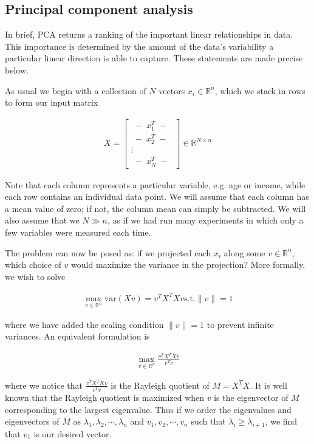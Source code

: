 \subsection{Principal component analysis \label{sec:pca}}

In brief, PCA returns a ranking of the important linear relationships
in data. This importance is determined by the amount of the data's
variability a particular linear direction is able to capture. These
statements are made precise below.

As usual we begin with a collection of $N$ vectors $x_i \in \mathbb{R}^n$,
which we stack in rows to form our input matrix

\begin{align*}
  X = \begin{bmatrix} \; - \; x_1^T \; - \; \\ \; - \; x_2^T \; - \; \\ \vdots \\ \; - \; x_N^T
    \; - \; \end{bmatrix} \in \mathbb{R}^{N \times n}
\end{align*}

Note that each column represents a particular variable, e.g. age or
income, while each row contains an individual data point. We will
assume that each column has a mean value of zero; if not, the column
mean can simply be subtracted. We will also assume that we $N \gg n$,
as if we had run many experiments in which only a few variables were
measured each time.

The problem can now be posed as: if we projected each $x_i$ along some
$v \in \mathbb{R}^n$, which choice of $v$ would maximize the variance
in the projection? More formally, we wish to solve

\begin{align*}
  \max_{v \in \mathbb{R}^n} \mathrm{var}(Xv) = v^TX^TXv 
  \mathrm{s.t.} \| v \| = 1
\end{align*}

where we have added the scaling condition $\| v \| = 1$ to prevent
infinite variances. An equivalent formulation is

\begin{align*}
  \max_{v \in \mathbb{R}^n} \frac{v^TX^TXv}{v^Tv}
\end{align*}

where we notice that $\frac{v^TX^TXv}{v^Tv}$ is the Rayleigh quotient
of $M = X^TX$. It is well known that the Rayleigh quotient is
maximized when $v$ is the eigenvector of $M$ corresponding to the
largest eigenvalue. Thus if we order the eigenvalues and eigenvectors
of $M$ as $\lambda_1, \lambda_2, \cdots, \lambda_n$ and
$v_1, v_2, \cdots, v_n$ such that $\lambda_i \ge \lambda_{i+1}$, we
find that $v_1$ is our desired vector.

